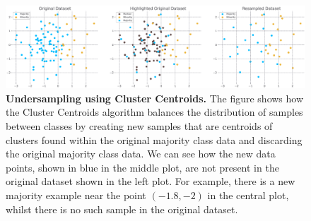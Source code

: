 \begin{figure}
    \centering
    \includegraphics[width=\linewidth]{figures/cluster_centroids.eps}
    \caption{
        \textbf{Undersampling using Cluster Centroids.} The figure shows how the Cluster Centroids
        algorithm balances the distribution of samples between classes by creating new samples that
        are centroids of clusters found within the original majority class data and discarding the
        original majority class data. We can see how the new data points, shown in blue in the
        middle plot, are not present in the original dataset shown in the left plot. For example,
        there is a new majority example near the point $(-1.8, -2)$ in the central plot, whilst
        there is no such sample in the original dataset.
    }
    \label{figure:cluster-centroids}
\end{figure}
